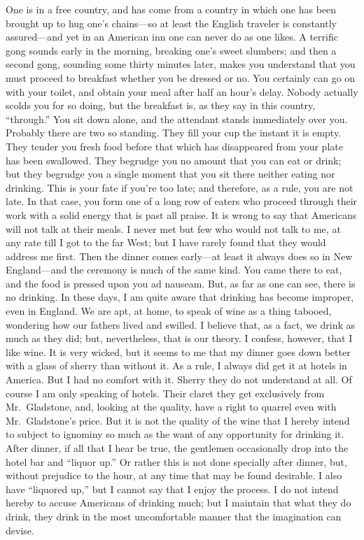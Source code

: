 One is in a free country, and has come from a country in which one
has been brought up to hug one's chains---so at least the English
traveler is constantly assured---and yet in an American inn one can
never do as one likes.  A terrific gong sounds early in the
morning, breaking one's sweet slumbers; and then a second gong,
sounding some thirty minutes later, makes you understand that you
must proceed to breakfast whether you be dressed or no.  You
certainly can go on with your toilet, and obtain your meal after
half an hour's delay.  Nobody actually scolds you for so doing, but
the breakfast is, as they say in this country, ``through.''  You sit
down alone, and the attendant stands immediately over you.
Probably there are two so standing.  They fill your cup the instant
it is empty.  They tender you fresh food before that which has
disappeared from your plate has been swallowed.  They begrudge you
no amount that you can eat or drink; but they begrudge you a single
moment that you sit there neither eating nor drinking.  This is
your fate if you're too late; and therefore, as a rule, you are not
late.  In that case, you form one of a long row of eaters who
proceed through their work with a solid energy that is past all
praise.  It is wrong to say that Americans will not talk at their
meals.  I never met but few who would not talk to me, at any rate
till I got to the far West; but I have rarely found that they would
address me first.  Then the dinner comes early---at least it always
does so in New England---and the ceremony is much of the same kind.
You came there to eat, and the food is pressed upon you ad nauseam.
But, as far as one can see, there is no drinking.  In these days, I
am quite aware that drinking has become improper, even in England.
We are apt, at home, to speak of wine as a thing tabooed, wondering
how our fathers lived and swilled.  I believe that, as a fact, we
drink as much as they did; but, nevertheless, that is our theory.
I confess, however, that I like wine.  It is very wicked, but it
seems to me that my dinner goes down better with a glass of sherry
than without it.  As a rule, I always did get it at hotels in
America.  But I had no comfort with it.  Sherry they do not
understand at all.  Of course I am only speaking of hotels.  Their
claret they get exclusively from Mr.\ Gladstone, and, looking at the
quality, have a right to quarrel even with Mr.\ Gladstone's price.
But it is not the quality of the wine that I hereby intend to
subject to ignominy so much as the want of any opportunity for
drinking it.  After dinner, if all that I hear be true, the
gentlemen occasionally drop into the hotel bar and ``liquor up.''  Or
rather this is not done specially after dinner, but, without
prejudice to the hour, at any time that may be found desirable.  I
also have ``liquored up,'' but I cannot say that I enjoy the process.
I do not intend hereby to accuse Americans of drinking much; but I
maintain that what they do drink, they drink in the most
uncomfortable manner that the imagination can devise.

